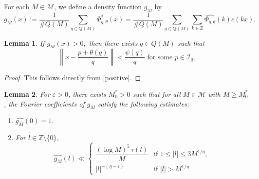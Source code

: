 \documentclass[12pt,a4paper,twoside]{article}
\newtheorem{lem}{Lemma}[section]
\begin{document}
For each $M \in \mathcal{M}$, we define a density function $g_M$ by
\[
g_M(x) := \frac{1}{\# Q(M)} \sum_{q \in Q(M)} \Phi_{q,\theta}^{\ast}(x)
      = \frac{1}{\# Q(M)} \sum_{q \in Q(M)} \sum_{k \in \mathbb{Z}} \widehat{\Phi_{q,\theta}}(k) e(kx).\]
\begin{lem}\label{subset}
    If $g_M(x)>0,$ then there exists $q\in Q(M)$ such that
    \[\left\|x-\frac{p+\theta(q)}{q}\right\|<\frac{\psi(q)}{q} \text{ for some } p\in \mathcal{I}_q.\]
\end{lem}

\begin{proof} This follows directly from \eqref{positive}.
\end{proof}





\begin{lem}\label{gM_Fourier}
For $\varepsilon>0$, there exists $M_0^{\ast}>0$ such that for all $M\in\mathcal{M}$ with $M\ge M_0^{\ast}$, the Fourier coefficients of $g_M$ satisfy the following estimates:
\begin{enumerate}
\item[(1)] $\widehat{g_M}(0)=1$.
\item[(2)] For $l\in \mathbb{Z}\setminus \{0\}$,
\[
 \widehat{g_M}(l)  \ll
\begin{cases}
\dfrac{(\log M)^{5}\,\tau(l)}{M} & \text{if } 1\le |l|\le 3 M^{1/\eta}, \\[10pt]
|l|^{-(\eta-\varepsilon)} & \text{if } |l| > M^{1/\eta}.
\end{cases}
\]

\end{enumerate}
\end{lem}
\end{document}
